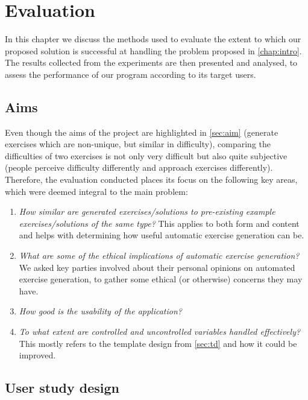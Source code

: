 \documentclass{l4proj}
\begin{document}
\chapter{Evaluation} 
\label{chap:ev}

In this chapter we discuss the methods used to evaluate the extent to which our proposed solution is successful at handling the problem proposed in \autoref{chap:intro}. The results collected from the experiments are then presented and analysed, to assess the performance of our program according to its target users.

\section{Aims}
\label{sec:evalAims}

Even though the aims of the project are highlighted in \autoref{sec:aim} (generate exercises which are non-unique, but similar in difficulty), comparing the difficulties of two exercises is not only very difficult but also quite subjective (people perceive difficulty differently and approach exercises differently). Therefore, the evaluation conducted places its focus on the following key areas, which were deemed integral to the main problem:

\begin{enumerate}
	\item
	\emph{How similar are generated exercises/solutions to pre-existing example exercises/solutions of the same type?} This applies to both form and content and helps with determining how useful automatic exercise generation can be.
	\item
	\emph{What are some of the ethical implications of automatic exercise generation?} We asked key parties involved about their personal opinions on automated exercise generation, to gather some ethical (or otherwise) concerns they may have.
	\item
	\emph{How good is the usability of the application?} 
	\item
	\emph{To what extent are controlled and uncontrolled variables handled effectively?} This mostly refers to the template design from \autoref{sec:td} and how it could be improved.
\end{enumerate}

\section{User study design}
\label{sec:exp_design}
\end{document}
